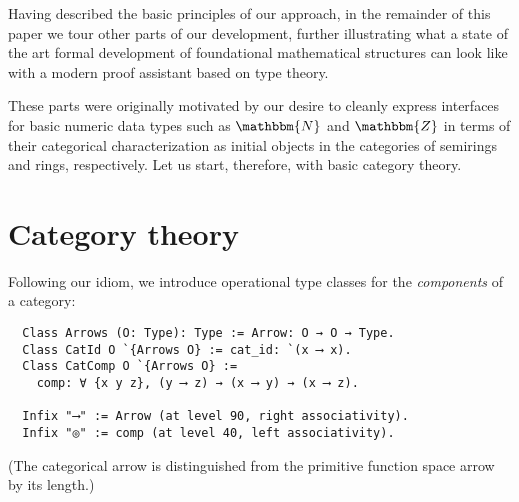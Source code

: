 \documentclass[a4paper,10pt,runningheads]{llncs}
\newcommand{\N}{\ensuremath{\mathbbm{N}}}
\newcommand{\Z}{\ensuremath{\mathbbm{Z}}}
\begin{document}
% 
% 

Having described the basic principles of our approach, in the remainder of this paper we tour other parts of our development, further illustrating what a state of the art formal development of foundational mathematical structures can look like with a modern proof assistant based on type theory.

These parts were originally motivated by our desire to cleanly express interfaces for basic numeric data types such as $\N$ and $\Z$ in terms of their categorical characterization as initial objects in the categories of semirings and rings, respectively. Let us start, therefore, with basic category theory.

\section{Category theory}\label{cat}

Following our idiom, we introduce operational type classes for the \emph{components} of a category:
\begin{lstlisting}
  Class Arrows (O: Type): Type := Arrow: O → O → Type.
  Class CatId O `{Arrows O} := cat_id: `(x ⟶ x).
  Class CatComp O `{Arrows O} :=
    comp: ∀ {x y z}, (y ⟶ z) → (x ⟶ y) → (x ⟶ z).

  Infix "⟶" := Arrow (at level 90, right associativity).
  Infix "◎" := comp (at level 40, left associativity).
\end{lstlisting}
(The categorical arrow is distinguished from the primitive function space arrow by its length.)
\end{document}
